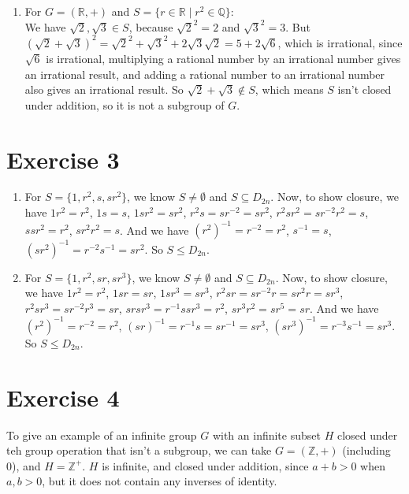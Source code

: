 \documentclass[12pt]{article}
\newcommand{\Z}{\mathbb{Z}}
\newcommand{\Q}{\mathbb{Q}}
\newcommand{\R}{\mathbb{R}}
\begin{document}
\begin{enumerate}[label=\textbf{\alph*.}]
        \item 
            For $G = (\R, +)$
            and $S = \{r \in \R \mid r^2 \in \Q\}:$ \\
            We have $\sqrt{2}, \sqrt{3} \in S$,
            because $\sqrt{2}^2 = 2$ and $\sqrt{3}^2 = 3$.
            But $(\sqrt{2} + \sqrt{3})^2
            = \sqrt{2}^2 + \sqrt{3}^2 + 2\sqrt{3}\sqrt{2}
            = 5 + 2\sqrt{6}$, which is irrational,
            since $\sqrt{6}$ is irrational,
            multiplying a rational number by an irrational number
            gives an irrational result,
            and adding a rational number to an irrational number also
            gives an irrational result.
            So $\sqrt{2} + \sqrt{3} \notin S$,
            which means $S$ isn't closed under addition,
            so it is not a subgroup of $G$.
    \end{enumerate}


    \section*{Exercise 3}
    \begin{enumerate}[label=\textbf{\alph*.}]
        \item 
            For $S = \{1, r^2, s, sr^2\}$,
            we know $S \neq \emptyset$ and $S \subseteq D_{2n}$.
            Now, to show closure, we have
            $1r^2 = r^2$, $1s = s$, $1sr^2 = sr^2$,
            $r^2s = sr^{-2} = sr^2$, $r^2sr^2 = sr^{-2}r^2 = s$,
            $ssr^2 = r^2$, $sr^2r^2 = s$.
            And we have $(r^2)^{-1} = r^{-2} = r^2$,
            $s^{-1} = s$, $(sr^2)^{-1} = r^{-2}s^{-1} = sr^2$.
            So $S \leqslant D_{2n}$.
        \item
            For $S = \{1, r^2, sr, sr^3\}$,
            we know $S \neq \emptyset$ and $S \subseteq D_{2n}$.
            Now, to show closure, we have
            $1r^2 = r^2$, $1sr = sr$, $1sr^3 = sr^3$,
            $r^2sr = sr^{-2}r = sr^2r = sr^3$, $r^2sr^3 = sr^{-2}r^3 = sr$,
            $srsr^3 = r^{-1}ssr^3 = r^2$, $sr^3r^2 = sr^5 = sr$.
            And we have $(r^2)^{-1} = r^{-2} = r^2$,
            $(sr)^{-1} = r^{-1}s = sr^{-1} = sr^3$,
            $(sr^3)^{-1} = r^{-3}s^{-1} = sr^3$.
            So $S \leqslant D_{2n}$.
    \end{enumerate}


    \section*{Exercise 4}
    To give an example of an infinite group $G$ with an infinite subset $H$
    closed under teh group operation that isn't a subgroup,
    we can take $G = (\Z, +)$ (including 0),
    and $H = \Z^+$. 
    $H$ is infinite, and closed under addition,
    since $a + b > 0$ when $a,b > 0$,
    but it does not contain any inverses of identity.
\end{document}
